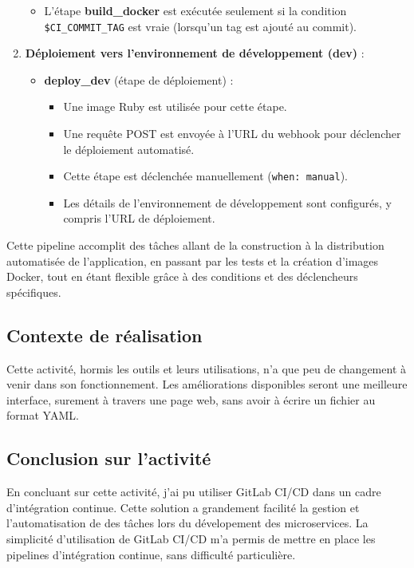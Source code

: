 \documentclass[a4paper, 11pt]{report}
\begin{document}
\begin{enumerate}
  \begin{itemize}
  \tightlist
  \item
    L'étape \textbf{build\_docker} est exécutée seulement si la
    condition \texttt{\$CI\_COMMIT\_TAG} est vraie (lorsqu'un tag est
    ajouté au commit).
  \end{itemize}
\item
  \textbf{Déploiement vers l'environnement de développement (dev)} :

  \begin{itemize}
  \tightlist
  \item
    \textbf{deploy\_dev} (étape de déploiement) :

    \begin{itemize}
    \tightlist
    \item
      Une image Ruby est utilisée pour cette étape.
    \item
      Une requête POST est envoyée à l'URL du webhook pour déclencher le
      déploiement automatisé.
    \item
      Cette étape est déclenchée manuellement (\texttt{when:\ manual}).
    \item
      Les détails de l'environnement de développement sont configurés, y
      compris l'URL de déploiement.
    \end{itemize}
  \end{itemize}
\end{enumerate}

Cette pipeline accomplit des tâches allant de la construction à la
distribution automatisée de l'application, en passant par les tests et
la création d'images Docker, tout en étant flexible grâce à des
conditions et des déclencheurs spécifiques.
\subsection{Contexte de réalisation}
Cette activité, hormis les outils et leurs utilisations, n'a que peu de changement à venir dans son fonctionnement.
Les améliorations disponibles seront une meilleure interface, surement à travers une page web, sans avoir à écrire un fichier au format YAML.
\subsection{Conclusion sur l'activité}
En concluant sur cette activité, j'ai pu utiliser GitLab CI/CD dans un cadre d'intégration continue.
Cette solution a grandement facilité la gestion et l'automatisation de des tâches lors du dévelopement des microservices.
La simplicité d'utilisation de GitLab CI/CD m'a permis de mettre en place les pipelines d'intégration continue, sans difficulté particulière.
\end{document}
